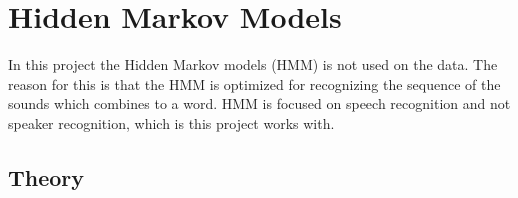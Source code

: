 \chapter{Hidden Markov Models}
In this project the Hidden Markov models (HMM) is not used on the data.
The reason for this is that the HMM is optimized for recognizing the sequence of the sounds which combines to a word.
HMM is focused on speech recognition and not speaker recognition, which is this project works with.



\section{Theory}   
